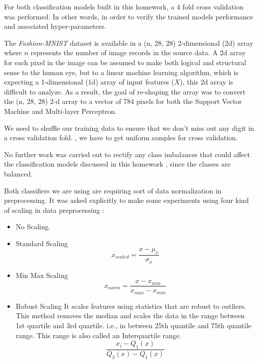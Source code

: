 \documentclass{article}
\begin{document}
	For both  classification models built in this homework, a 4 fold cross validation was performed. In other words,  in order to verify the trained models performance and associated hyper-parameters.
	
	The \textit{Fashion-MNIST} dataset is available in a (n, 28, 28) 2-dimensional (2d) array where $n$ represents the number of image records in the source data. A 2d array for each pixel in the image can be assumed to make both logical and structural sense to the human eye, but to
	a linear machine learning algorithm, which is expecting a 1-dimensional (1d) array of input features ($X$), this 2d array is difficult to analyze. As a result, the goal of re-shaping the array was to convert the (n, 28, 28) 2-d array to a vector of 784 pixels for both the Support Vector Machine and Multi-layer Perceptron.
	
	We need to shuffle our training data to ensure that we don't miss out any digit in a cross validation fold. , we have  to get uniform samples for cross validation. 
	
	No further work was  carried out to rectify any class imbalances that could affect the classification models discussed in this homework , since the classes are balanced.
	
	Both classifiers we are using are requiring sort of data normalization in preprocessing. It was asked explicitly to make some experiments using four kind of scaling in data preprocessing :
	\begin{itemize}
		\item No Scaling.
		\item Standard Scaling 
		\begin{equation*}
			x_{scaled} = \frac{x - \mu_x}{\sigma_x}
		\end{equation*}
		\item Min Max Scaling
		\begin{equation*}
			x_{norm} = \frac{x-x_{min}}{x_{max}-x_{min}}
		\end{equation*}
		\item Robust Scaling 
		It scales features using statistics that are robust to outliers. This method removes the median and scales the data in the range between 1st quartile and 3rd quartile. i.e., in between 25th quantile and 75th quantile range. This range is also called an Interquartile range.
		\begin{equation*}
			\frac{x_i - Q_1(x)}{Q_3(x) - Q_1(x)}
		\end{equation*}
	\end{itemize}
	
\end{document}
